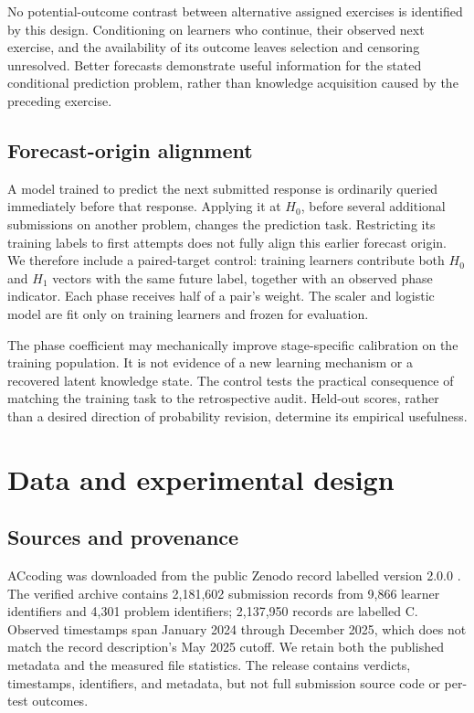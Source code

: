 \documentclass[11pt]{article}
\newcommand{\1}{\mathbb{I}}
\begin{document}
No potential-outcome contrast between alternative assigned exercises is identified by this design. Conditioning on learners who continue, their observed next exercise, and the availability of its outcome leaves selection and censoring unresolved. Better forecasts demonstrate useful information for the stated conditional prediction problem, rather than knowledge acquisition caused by the preceding exercise.

\subsection{Forecast-origin alignment}
A model trained to predict the next submitted response is ordinarily queried immediately before that response. Applying it at $H_0$, before several additional submissions on another problem, changes the prediction task. Restricting its training labels to first attempts does not fully align this earlier forecast origin. We therefore include a paired-target control: training learners contribute both $H_0$ and $H_1$ vectors with the same future label, together with an observed phase indicator. Each phase receives half of a pair's weight. The scaler and logistic model are fit only on training learners and frozen for evaluation.

The phase coefficient may mechanically improve stage-specific calibration on the training population. It is not evidence of a new learning mechanism or a recovered latent knowledge state. The control tests the practical consequence of matching the training task to the retrospective audit. Held-out scores, rather than a desired direction of probability revision, determine its empirical usefulness.

\section{Data and experimental design}
\subsection{Sources and provenance}
ACcoding was downloaded from the public Zenodo record labelled version 2.0.0 \cite{accoding2026}. The verified archive contains 2,181,602 submission records from 9,866 learner identifiers and 4,301 problem identifiers; 2,137,950 records are labelled C. Observed timestamps span January 2024 through December 2025, which does not match the record description's May 2025 cutoff. We retain both the published metadata and the measured file statistics. The release contains verdicts, timestamps, identifiers, and metadata, but not full submission source code or per-test outcomes.
\end{document}
